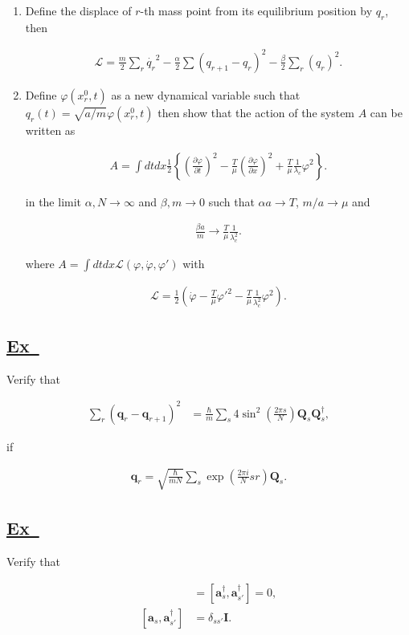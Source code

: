 \documentclass[a4paper,12pt]{article}
\newcommand{\excercise}{\addtocounter{section}{+1}
\subsection*{\underline{Ex~\thesection}}}
\begin{document}
\begin{enumerate}
\item Define the displace of $r$-th mass point from its equilibrium position by $q_r$, then

\begin{align}
\mathcal{L}=\frac{m}{2}\sum_r\dot{q_r}^2-\frac{\alpha}{2}\sum\left(
q_{r+1}-q_r\right)^2-\frac{\beta}{2}\sum_r(q_r)^2.
\end{align}

\item Define $\varphi(x_r^0, t)$ as a new dynamical variable such that $q_r(t)=\sqrt{a/m}\varphi (x_r^0, t)$ then show that the action of the system $A$ can be written as

\begin{align}
A=\int dt dx \frac{1}{2}\left\{\left(\frac{\partial\varphi}{\partial t}\right)^2-
\frac{T}{\mu} \left(\frac{\partial\varphi}{\partial x}\right)^2+\frac{T}{\mu}\frac{1}{\lambda_c}\varphi^2\right\}.
\end{align}

in the limit $\alpha, N\longrightarrow \infty$ and $\beta, m \longrightarrow 0$ such that $\alpha a\longrightarrow T$, $m/a\longrightarrow \mu$ and

\begin{align*}
\frac{\beta a}{m}\longrightarrow \frac{T}{\mu}\frac{1}{\lambda_c^2}.
\end{align*}

where $A=\int dt dx \mathcal{L}(\varphi, \dot{\varphi}, \varphi')$ with

\begin{align*}
\mathcal{L}=\frac{1}{2}(\dot{\varphi}-\frac{T}{\mu}\varphi'^2-\frac{T}{\mu}\frac{1}{\lambda_c^2}\varphi^2).
\end{align*}
\end{enumerate}

\excercise

Verify that

\begin{align}
\sum_r(\bm{q}_r-\bm{q}_{r+1})^2&=\frac{\hbar}{m}\sum_s 4\sin^2\left(\frac{2\pi s}{N}\right)\bm{Q}_s\bm{Q}_s^\dag,
\end{align}

if 

\begin{align*}
\bm{q}_r=\sqrt{\frac{\hbar}{mN}}\sum_s\exp\left(\frac{2\pi i}{N}sr\right)\bm{Q}_s.
\end{align*}

\excercise

Verify that

\begin{align*}
[\bm{a}_{s} , \bm{a}_{s'} ]&=[\bm{a}_{s}^\dag , \bm{a}^{\dag}_{s'}]=0,\\
[\bm{a}_{s}, \bm{a}^\dag_{s'}]&=\delta_{ss'}\mathbf{I}.
\end{align*}
\end{document}
